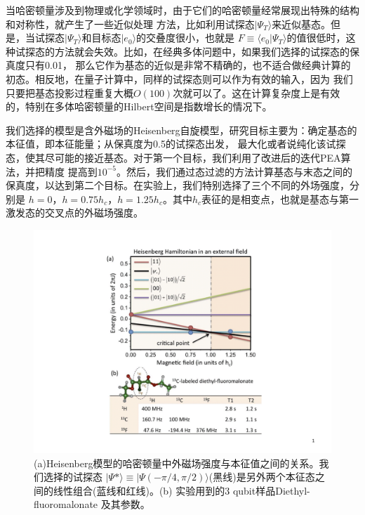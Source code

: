 当哈密顿量涉及到物理或化学领域时，由于它们的哈密顿量经常展现出特殊的结构和对称性，就产生了一些近似处理
方法，比如利用试探态$|\Psi_T \rangle$来近似基态。但是，当试探态$|\Psi_T \rangle$和目标态$|e_0 \rangle$的交叠度很小，也就是
$F \equiv \langle e_0 |\Psi_T \rangle$的值很低时，这种试探态的方法就会失效。比如，在经典多体问题中，如果我们选择的试探态的保真度只有0.01，
那么它作为基态的近似是非常不精确的，也不适合做经典计算的初态。相反地，在量子计算中，同样的试探态则可以作为有效的输入，因为
我们只要把基态投影过程\cite{lq7}重复大概$O(100)$次就可以了。这在计算复杂度上是有效的，特别在多体哈密顿量的Hilbert空间是指数增长的情况下。

我们选择的模型是含外磁场的Heisenberg自旋模型，研究目标主要为：确定基态的本征值，即本征能量；从保真度为0.5的试探态出发，
最大化或者说纯化该试探态，使其尽可能的接近基态。对于第一个目标，我们利用了改进后的迭代PEA算法，并把精度
提高到$10^{-5}$。然后，我们通过态过滤的方法计算基态与末态之间的保真度，以达到第二个目标。在实验上，我们特别选择了三个不同的外场强度，分别是
$h =0$，$h =0.75h_c$，$h =1.25h_c$。其中$h_c$表征的是相变点，也就是基态与第一激发态的交叉点的外磁场强度。

 \begin{figure}[htbp]
            \begin{center}
              \includegraphics[width= 0.7\columnwidth]{figures/heisen1.pdf}
              \caption{(a)Heisenberg模型的哈密顿量中外磁场强度与本征值之间的关系。我们选择的试探态
              $|\Psi\ast\rangle \equiv|\Psi(-\pi/4,\pi/2)\rangle$(黑线)是另外两个本征态之间的线性组合(蓝线和红线)。(b)
              实验用到的3 qubit样品Diethyl-fluoromalonate 及其参数。}\label{heisen1}
            \end{center}
 \end{figure}

